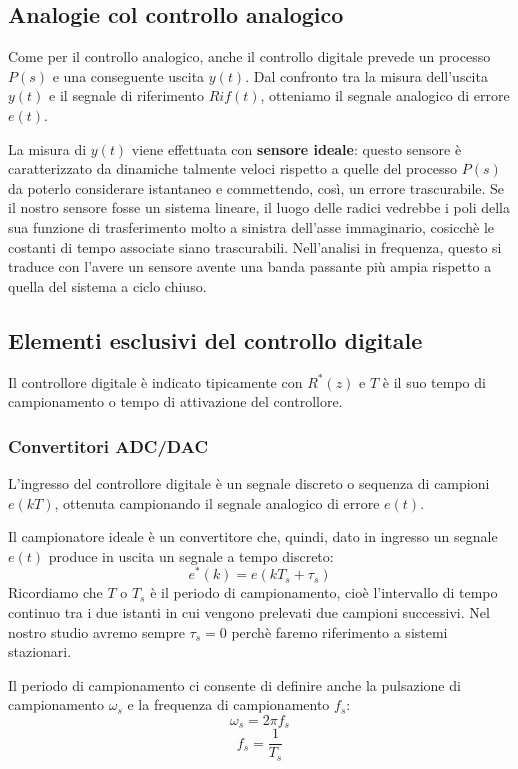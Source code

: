 \documentclass[a4paper]{report}
\newcommand{\bo}{\bfseries }
\begin{document}
\subsection{Analogie col controllo analogico}
Come per il controllo analogico, anche il controllo digitale prevede
un processo $P(s)$ e una conseguente uscita $y(t)$. Dal confronto tra
la misura dell'uscita $y(t)$ e il segnale di riferimento $Rif(t)$,
otteniamo il segnale analogico di errore $e(t)$.

La misura di $y(t)$ viene effettuata con {\bo sensore
  ideale}: questo sensore \`e caratterizzato da
dinamiche talmente veloci rispetto a quelle del processo $P(s)$ da poterlo
considerare istantaneo e commettendo, cos\`i, un errore
trascurabile. Se il nostro sensore fosse un sistema lineare, il luogo
delle radici vedrebbe i poli della sua funzione di trasferimento molto
a sinistra dell'asse immaginario, cosicch\`e le costanti di tempo
associate siano trascurabili. Nell'analisi in frequenza, questo si
traduce con l'avere un sensore avente una banda passante pi\`u ampia
rispetto a quella del sistema a ciclo chiuso.

\subsection{Elementi esclusivi del controllo digitale}
Il controllore digitale \`e indicato tipicamente con $R^{*}(z)$ e $T$
\`e il suo tempo di campionamento o
tempo di attivazione del controllore.

\subsubsection{Convertitori ADC/DAC}
L'ingresso del controllore digitale \`e un segnale discreto o sequenza
di campioni $e(kT)$, ottenuta campionando il segnale analogico di
errore $e(t)$.

Il campionatore ideale \`e un convertitore
che, quindi, dato in ingresso un segnale $e(t)$ produce in uscita un
segnale a tempo discreto:
\[
e^{*}(k) = e (kT_s + \tau_s)
\]
Ricordiamo che $T$ o $T_s$ \`e il periodo di campionamento, cio\`e l'intervallo di tempo continuo tra i due
istanti in cui vengono prelevati due campioni successivi. Nel nostro
studio avremo sempre $\tau_s = 0$ perch\`e faremo riferimento a
sistemi stazionari.

Il periodo di campionamento ci consente di definire anche la
pulsazione di campionamento
$\omega_s$ e la frequenza di campionamento $f_s$:
\[
\omega_s = 2 \pi f_s
\]
\[
f_s = \dfrac{1}{T_s}
\]
\end{document}

